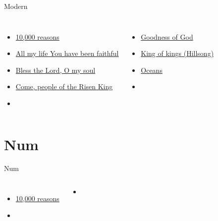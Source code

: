 \documentclass[aspectratio=169]{beamer}
\begin{document}
\begin{frame}[t]{Modern}
\begin{columns}[t]
\begin{itemize}
    \item \hyperlink{10,000 reasons['Bless the Lord, O my soul']}{10,000 reasons}

    \item \hyperlink{Goodness of God['All my life You have been faithful']}{All my life You have been faithful}

    \item \hyperlink{10,000 reasons['Bless the Lord, O my soul']}{Bless the Lord, O my soul}

    \item \hyperlink{Come, people of the Risen King[]}{Come, people of the Risen King}

    \item[] \phantom{1}
\end{itemize}
\begin{itemize}
    \item \hyperlink{Goodness of God['All my life You have been faithful']}{Goodness of God}

    \item \hyperlink{King of kings[](Hillsong)}{King of kings (Hillsong)}

    \item \hyperlink{Oceans[](Hillsong)}{Oceans}

    \item[] \phantom{1}
\end{itemize}
\end{columns}
\end{frame}

\section{ Num }

\begin{frame}[t]{Num}
\begin{columns}[t]
\begin{itemize}
    \item \hyperlink{10,000 reasons['Bless the Lord, O my soul']}{10,000 reasons}
    \item[] \phantom{1}
\end{itemize}
\begin{itemize}
    \item[] \phantom{1}
\end{itemize}
\end{columns}
\end{frame}
\end{document}
